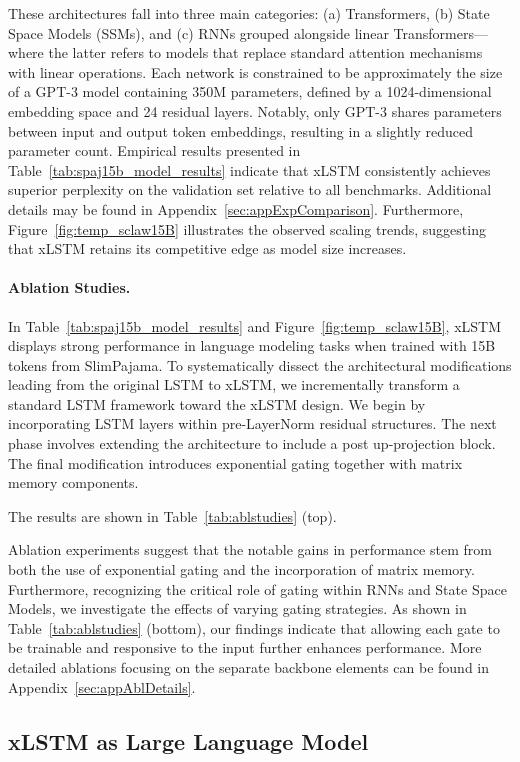 These architectures fall into three main categories: (a) Transformers, (b) State Space Models (SSMs), and (c) RNNs grouped alongside linear Transformers—where the latter refers to models that replace standard attention mechanisms with linear operations. Each network is constrained to be approximately the size of a GPT-3 model containing 350M parameters, defined by a 1024-dimensional embedding space and 24 residual layers. Notably, only GPT-3 shares parameters between input and output token embeddings, resulting in a slightly reduced parameter count. Empirical results presented in Table~\ref{tab:spaj15b_model_results} indicate that xLSTM consistently achieves superior perplexity on the validation set relative to all benchmarks. Additional details may be found in Appendix~\ref{sec:appExpComparison}. Furthermore, Figure~\ref{fig:temp_sclaw15B} illustrates the observed scaling trends, suggesting that xLSTM retains its competitive edge as model size increases.

\paragraph{Ablation Studies.}
In Table~\ref{tab:spaj15b_model_results} and Figure~\ref{fig:temp_sclaw15B}, xLSTM displays strong performance in language modeling tasks when trained with 15B tokens from SlimPajama. To systematically dissect the architectural modifications leading from the original LSTM to xLSTM, we incrementally transform a standard LSTM framework toward the xLSTM design. We begin by incorporating LSTM layers within pre-LayerNorm residual structures. The next phase involves extending the architecture to include a post up-projection block. The final modification introduces exponential gating together with matrix memory components.

The results are shown in Table~\ref{tab:ablstudies} (top). 

Ablation experiments suggest that the notable gains in performance stem from both the use of exponential gating and the incorporation of matrix memory. Furthermore, recognizing the critical role of gating within RNNs and State Space Models, we investigate the effects of varying gating strategies. As shown in Table~\ref{tab:ablstudies} (bottom), our findings indicate that allowing each gate to be trainable and responsive to the input further enhances performance. More detailed ablations focusing on the separate backbone elements can be found in Appendix~\ref{sec:appAblDetails}.

\subsection{xLSTM as Large Language Model}
\label{sec:ExpLanguage}

